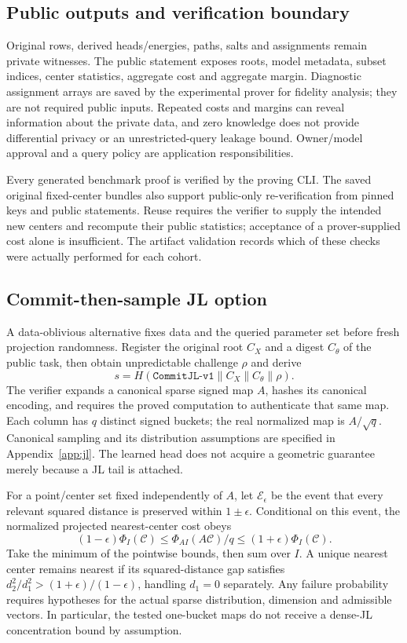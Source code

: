 \subsection{Public outputs and verification boundary}
Original rows, derived heads/energies, paths, salts and assignments remain private witnesses. The public statement exposes roots, model metadata, subset indices, center statistics, aggregate cost and aggregate margin. Diagnostic assignment arrays are saved by the experimental prover for fidelity analysis; they are not required public inputs. Repeated costs and margins can reveal information about the private data, and zero knowledge does not provide differential privacy or an unrestricted-query leakage bound. Owner/model approval and a query policy are application responsibilities.

Every generated benchmark proof is verified by the proving CLI. The saved original fixed-center bundles also support public-only re-verification from pinned keys and public statements. Reuse requires the verifier to supply the intended new centers and recompute their public statistics; acceptance of a prover-supplied cost alone is insufficient. The artifact validation records which of these checks were actually performed for each cohort.

\subsection{Commit-then-sample JL option}\label{sec:theory}
A data-oblivious alternative fixes data and the queried parameter set before fresh projection randomness. Register the original root $C_X$ and a digest $C_\theta$ of the public task, then obtain unpredictable challenge $\rho$ and derive
\begin{equation}
s=H(\texttt{CommitJL-v1}\|C_X\|C_\theta\|\rho).
\end{equation}
The verifier expands a canonical sparse signed map $A$, hashes its canonical encoding, and requires the proved computation to authenticate that same map. Each column has $q$ distinct signed buckets; the real normalized map is $A/\sqrt q$. Canonical sampling and its distribution assumptions are specified in Appendix~\ref{app:jl}. The learned head does not acquire a geometric guarantee merely because a JL tail is attached.

For a point/center set fixed independently of $A$, let $\mathcal E_\epsilon$ be the event that every relevant squared distance is preserved within $1\pm\epsilon$. Conditional on this event, the normalized projected nearest-center cost obeys
\begin{equation}
(1-\epsilon)\Phi_I(\mathcal C)\le
\Phi_{AI}(A\mathcal C)/q\le(1+\epsilon)\Phi_I(\mathcal C).
\end{equation}
Take the minimum of the pointwise bounds, then sum over $I$. A unique nearest center remains nearest if its squared-distance gap satisfies $d_2^2/d_1^2>(1+\epsilon)/(1-\epsilon)$, handling $d_1=0$ separately. Any failure probability requires hypotheses for the actual sparse distribution, dimension and admissible vectors. In particular, the tested one-bucket maps do not receive a dense-JL concentration bound by assumption.

